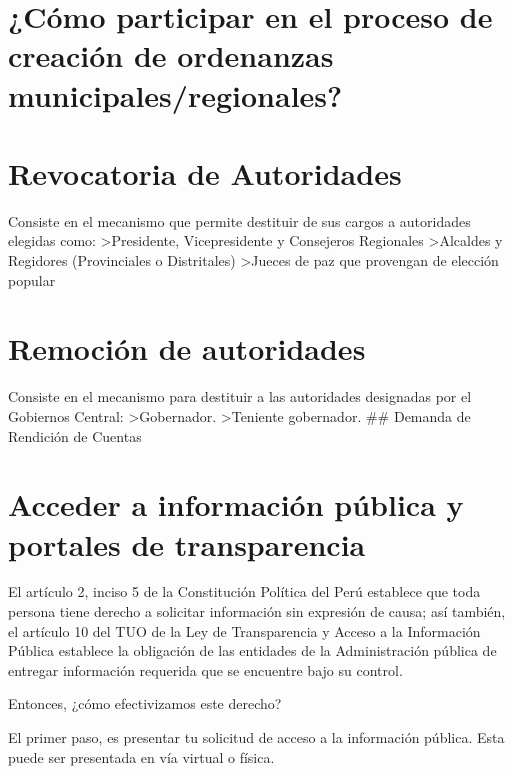 \documentclass[
]{book}
\begin{document}
\hypertarget{cuxf3mo-participar-en-el-proceso-de-creaciuxf3n-de-ordenanzas-municipalesregionales}{%
\section{¿Cómo participar en el proceso de creación de ordenanzas municipales/regionales?}\label{cuxf3mo-participar-en-el-proceso-de-creaciuxf3n-de-ordenanzas-municipalesregionales}}

\hypertarget{revocatoria-de-autoridades}{%
\section{Revocatoria de Autoridades}\label{revocatoria-de-autoridades}}

Consiste en el mecanismo que permite destituir de sus cargos a autoridades elegidas como:
\textgreater Presidente, Vicepresidente y Consejeros Regionales
\textgreater Alcaldes y Regidores (Provinciales o Distritales)
\textgreater Jueces de paz que provengan de elección popular

\hypertarget{remociuxf3n-de-autoridades}{%
\section{Remoción de autoridades}\label{remociuxf3n-de-autoridades}}

Consiste en el mecanismo para destituir a las autoridades designadas por el Gobiernos Central:
\textgreater Gobernador.
\textgreater Teniente gobernador.
\#\# Demanda de Rendición de Cuentas

\hypertarget{acceder-a-informaciuxf3n-puxfablica-y-portales-de-transparencia}{%
\section{Acceder a información pública y portales de transparencia}\label{acceder-a-informaciuxf3n-puxfablica-y-portales-de-transparencia}}

El artículo 2, inciso 5 de la Constitución Política del Perú establece que toda persona tiene derecho a solicitar información sin expresión de causa; así también,
el artículo 10 del TUO de la Ley de Transparencia y Acceso a la Información Pública establece la obligación de las entidades de la Administración pública de entregar información requerida que se encuentre bajo su control.

Entonces, ¿cómo efectivizamos este derecho?

El primer paso, es presentar tu solicitud de acceso a la información pública. Esta puede ser presentada en vía virtual o física.
\end{document}
